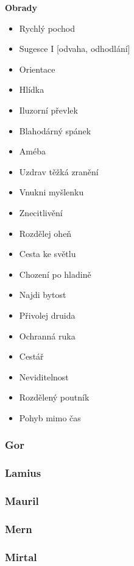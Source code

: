 \documentclass[../main.tex]{subfiles}
\begin{document}
\textbf{Obrady}
\begin{itemize}

    \item Rychlý pochod
    \item Sugesce I [odvaha, odhodlání]
    \item Orientace
    \item Hlídka
    \item Iluzorní převlek
    \item Blahodárný spánek
    \item Améba
\item Uzdrav těžká zranění
\item Vnukni myšlenku
\item Znecitlivění
\item Rozdělej oheň
\item Cesta ke světlu
\item Chození po hladině
\item Najdi bytost
\item Přivolej druida
\item Ochranná ruka 
\item Cestář
\item Neviditelnost
    \item Rozdělený poutník
    \item Pohyb mimo čas
\end{itemize}

\subsubsection{Gor}
\label{sec:gor}

\subsubsection{Lamius}
\label{sec:lamius}

\subsubsection{Mauril}
\label{sec:mauril}

\subsubsection{Mern}
\label{sec:mern}

\subsubsection{Mirtal}
\label{sec:mirtal}
\end{document}
